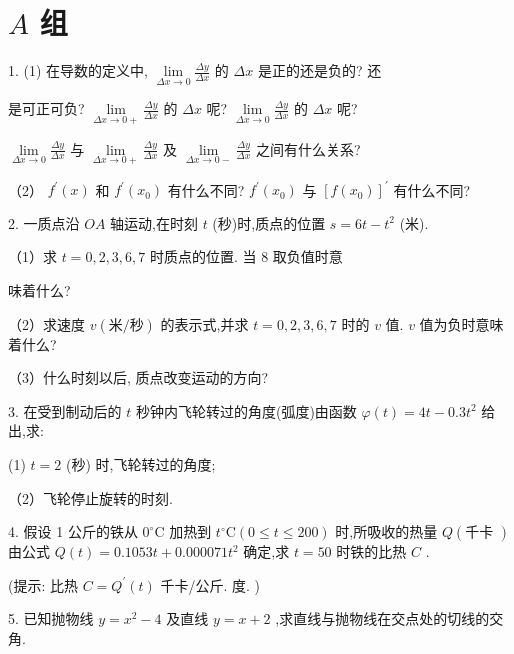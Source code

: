 \documentclass[lang=cn,newtx,10pt,scheme=chinese]{elegantbook}
\begin{document}
\section*{\(A\) 组}

1. (1) 在导数的定义中, \(\mathop{\lim }\limits_{{{\Delta x} \rightarrow 0}}\frac{\Delta y}{\Delta x}\) 的 \({\Delta x}\) 是正的还是负的? 还

是可正可负? \(\mathop{\lim }\limits_{{{\Delta x} \rightarrow 0 + }}\frac{\Delta y}{\Delta x}\) 的 \({\Delta x}\) 呢? \(\mathop{\lim }\limits_{{{\Delta x} \rightarrow 0}}\frac{\Delta y}{\Delta x}\) 的 \({\Delta x}\) 呢?

\(\mathop{\lim }\limits_{{{\Delta x} \rightarrow 0}}\frac{\Delta y}{\Delta x}\) 与 \(\mathop{\lim }\limits_{{{\Delta x} \rightarrow 0 + }}\frac{\Delta y}{\Delta x}\) 及 \(\mathop{\lim }\limits_{{{\Delta x} \rightarrow 0 - }}\frac{\Delta y}{\Delta x}\) 之间有什么关系?

（2） \({f}^{\prime }\left( x\right)\) 和 \({f}^{\prime }\left( {x}_{0}\right)\) 有什么不同? \({f}^{\prime }\left( {x}_{0}\right)\) 与 \({\left\lbrack f\left( {x}_{0}\right) \right\rbrack }^{\prime }\) 有什么不同?

2. 一质点沿 \({OA}\) 轴运动,在时刻 \(t\) (秒)时,质点的位置 \(s = {6t} - {t}^{2}\) (米).

（1）求 \(t = 0,2,3,6,7\) 时质点的位置. 当 8 取负值时意

味着什么?

（2）求速度 \(v\left( {\text{米}/\text{秒}}\right)\) 的表示式,并求 \(t = 0,2,3,6,7\) 时的 \(v\) 值. \(v\) 值为负时意味着什么?

（3）什么时刻以后, 质点改变运动的方向?

3. 在受到制动后的 \(t\) 秒钟内飞轮转过的角度(弧度)由函数 \(\varphi \left( t\right) = {4t} - {0.3}{t}^{2}\) 给出,求:

(1) \(t = 2\) (秒) 时,飞轮转过的角度;

（2）飞轮停止旋转的时刻.

4. 假设 1 公斤的铁从 \({0}^{ \circ }\mathrm{C}\) 加热到 \({t}^{ \circ }\mathrm{C}\left( {0 \leq t \leq {200}}\right)\) 时,所吸收的热量 \(Q\left( \text{千卡 }\right)\) 由公式 \(Q\left( t\right) = {0.1053t} + {0.000071}{t}^{2}\) 确定,求 \(t = {50}\) 时铁的比热 \(C\) .

(提示: 比热 \(C = {Q}^{\prime }\left( t\right)\) 千卡/公斤. 度. )

5. 已知抛物线 \(y = {x}^{2} - 4\) 及直线 \(y = x + 2\) ,求直线与抛物线在交点处的切线的交角.
\end{document}
